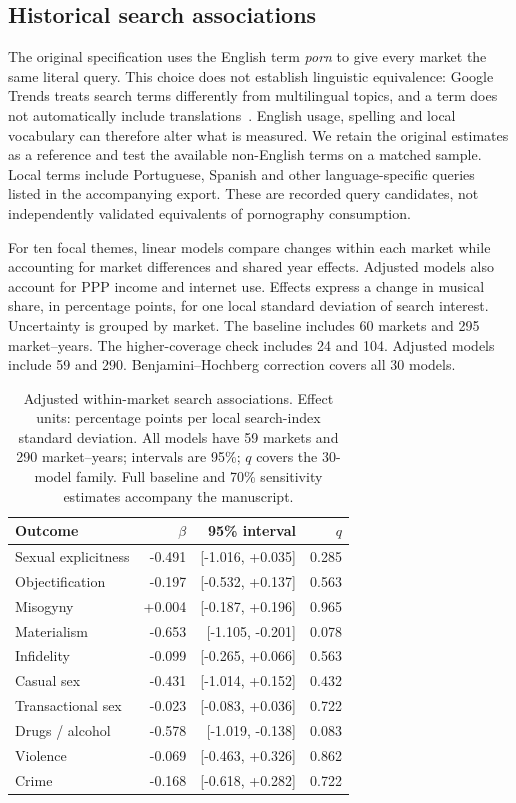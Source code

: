 \documentclass[10pt,a4paper,twocolumn]{article}
\begin{document}
\subsection{Historical search associations}
The original specification uses the English term \textit{porn} to give every market the same literal query. This choice does not establish linguistic equivalence: Google Trends treats search terms differently from multilingual topics, and a term does not automatically include translations~\cite{trendscompare}. English usage, spelling and local vocabulary can therefore alter what is measured. We retain the original estimates as a reference and test the available non-English terms on a matched sample. Local terms include Portuguese, Spanish and other language-specific queries listed in the accompanying export. These are recorded query candidates, not independently validated equivalents of pornography consumption.

For ten focal themes, linear models compare changes within each market while accounting for market differences and shared year effects. Adjusted models also account for PPP income and internet use. Effects express a change in musical share, in percentage points, for one local standard deviation of search interest. Uncertainty is grouped by market. The baseline includes 60 markets and 295 market--years. The higher-coverage check includes 24 and 104. Adjusted models include 59 and 290. Benjamini--Hochberg correction covers all 30 models.

\begin{table}[t]
\caption{Adjusted within-market search associations. Effect units: percentage points per local search-index standard deviation. All models have 59 markets and 290 market--years; intervals are 95\%; $q$ covers the 30-model family. Full baseline and 70\% sensitivity estimates accompany the manuscript.}
\label{tab:models}
\centering\small\setlength{\tabcolsep}{3pt}
\begin{tabularx}{\textwidth}{@{}Xrrr@{}}
\toprule Outcome & $\beta$ & 95\% interval & $q$ \\
\midrule
Sexual explicitness & -0.491 & [-1.016, +0.035] & 0.285 \\
Objectification & -0.197 & [-0.532, +0.137] & 0.563 \\
Misogyny & +0.004 & [-0.187, +0.196] & 0.965 \\
Materialism & -0.653 & [-1.105, -0.201] & 0.078 \\
Infidelity & -0.099 & [-0.265, +0.066] & 0.563 \\
Casual sex & -0.431 & [-1.014, +0.152] & 0.432 \\
Transactional sex & -0.023 & [-0.083, +0.036] & 0.722 \\
Drugs / alcohol & -0.578 & [-1.019, -0.138] & 0.083 \\
Violence & -0.069 & [-0.463, +0.326] & 0.862 \\
Crime & -0.168 & [-0.618, +0.282] & 0.722 \\
\bottomrule
\end{tabularx}
\end{table}
\end{document}
